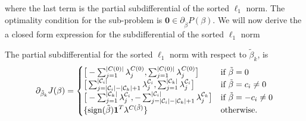 where the last term is the partial subdifferential of the sorted \(\ell_1\)
norm.
The optimality condition for the sub-problem is \(\boldsymbol{0} \in
\partial_{\tilde \beta} P(\beta). 
\)
We will now derive the  a closed form expression for the subdifferential
of the sorted $\ell_1$ norm
\begin{theorem}
  \label{thm:cluster-subdifferential}
  The partial subdifferential for the sorted \(\ell_1\) norm with respect
  to \(\tilde\beta_k\), is
  \[
    \partial_{\tilde \beta_k}  J(\beta)       =
    \begin{cases}
      \big[-\sum_{j=1}^{|C(0)|}\lambda^{C(0)}_j, \sum_{j=1}^{|C(0)|}\lambda^{C(0)}_j\big]                            & \text{if } \tilde\beta = 0           \\
      \big[\sum_{j=|\mathcal{C}_i| - |\mathcal{C}_k|+1}^{|\mathcal{C}_i|}\lambda^{\mathcal{C}_i}_j, \sum_{j=1}^{|\mathcal{C}_k|}\lambda^{\mathcal{C}_i}_j\big]   & \text{if } \tilde\beta = c_i \neq 0  \\
      \big[-\sum_{j=1}^{|\mathcal{C}_k|}\lambda^{\mathcal{C}_i}_j, -\sum_{j=|\mathcal{C}_i| - |\mathcal{C}_k|+1}^{|\mathcal{C}_i|}\lambda^{\mathcal{C}_k}_j\big] & \text{if } \tilde\beta = -c_i \neq 0 \\
      \{\operatorname{sign}(\tilde\beta)\boldsymbol{1}^T\lambda^{C(\tilde\beta)}\}                                                                                       & \text{otherwise.
      }
    \end{cases}
  \]
\end{theorem}
